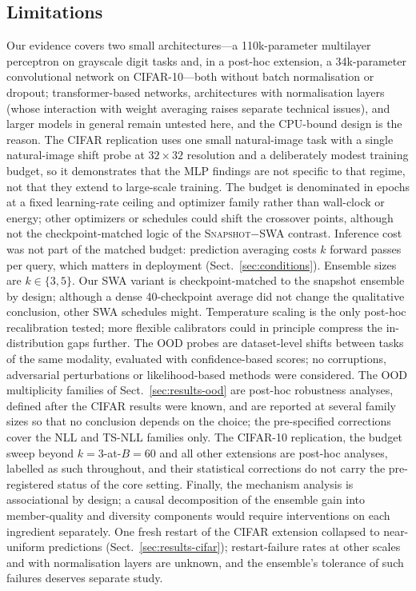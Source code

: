 \documentclass[11pt,a4paper]{article}
\newcommand{\snapshot}{\textsc{Snapshot}}
\newcommand{\swa}{\textsc{SWA}}
\newcommand{\ts}{\textsc{TS}}
\begin{document}
\subsection{Limitations}\label{sec:limitations}

Our evidence covers two small architectures---a 110k-parameter multilayer
perceptron on grayscale digit tasks and, in a post-hoc extension, a
34k-parameter convolutional network on CIFAR-10---both without batch
normalisation or dropout; transformer-based networks, architectures with
normalisation layers (whose interaction with weight averaging raises
separate technical issues), and larger models in general remain untested
here, and the CPU-bound design is the reason. The CIFAR replication uses
one small natural-image task with a single natural-image shift probe at
$32\times32$ resolution and a deliberately modest training budget, so it
demonstrates that the MLP findings are not specific to that regime, not
that they extend to large-scale training. The budget is denominated in
epochs at a fixed learning-rate ceiling and optimizer family rather than
wall-clock or energy; other optimizers or schedules could shift the
crossover points, although not the checkpoint-matched logic of the
\snapshot$-$\swa{} contrast. Inference cost was not part of the matched
budget: prediction averaging costs $k$ forward passes per query, which
matters in deployment (Sect.~\ref{sec:conditions}). Ensemble sizes are
$k \in \{3,5\}$. Our \swa{} variant is checkpoint-matched to
the snapshot ensemble by design; although a dense 40-checkpoint average
did not change the qualitative conclusion, other \swa{} schedules might.
Temperature scaling is the only post-hoc recalibration tested; more
flexible calibrators \citep{zhang2020} could in principle compress the
in-distribution gaps further. The OOD probes are dataset-level shifts
between tasks of the same modality, evaluated with confidence-based
scores; no corruptions, adversarial perturbations or likelihood-based
methods were considered. The OOD multiplicity families of
Sect.~\ref{sec:results-ood} are post-hoc robustness analyses, defined after
the CIFAR results were known, and are reported at several family sizes so
that no conclusion depends on the choice; the pre-specified corrections
cover the NLL and \ts-NLL families only. The CIFAR-10 replication, the budget sweep beyond
$k=3$-at-$B=60$ and all other extensions are post-hoc analyses, labelled
as such throughout, and their statistical corrections do not carry the
pre-registered status of the core setting. Finally, the mechanism analysis
is associational by design; a causal decomposition of the ensemble gain into
member-quality and diversity components would require interventions on
each ingredient separately. One fresh restart of the CIFAR extension
collapsed to near-uniform predictions (Sect.~\ref{sec:results-cifar});
restart-failure rates at other scales and with normalisation layers are
unknown, and the ensemble's tolerance of such failures deserves separate
study.
\end{document}
